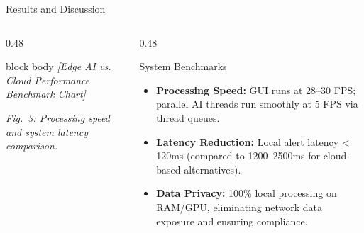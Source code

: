 \documentclass[aspectratio=169, 10pt]{beamer}
\begin{document}
\begin{frame}{Results and Discussion}
  \begin{columns}[T]
    \begin{column}{0.48\textwidth}
      \begin{beamercolorbox}[wd=\textwidth, rounded=true, sep=5pt,
            center]{block body}
        \vspace{1.8cm}
        \textit{\small [Edge AI vs. Cloud Performance Benchmark Chart]}
        \vspace{1.8cm}
      \end{beamercolorbox}
      \vspace{0.3em}
      {\footnotesize\textit{Fig.~3: Processing speed and system latency comparison.}}
    \end{column}
    \begin{column}{0.48\textwidth}
      \begin{block}{\textcolor{MLIOTwhite}{System Benchmarks}}
        \begin{itemize}
          \item \textbf{Processing Speed:} GUI runs at 28–30 FPS; parallel AI threads run smoothly at 5 FPS via thread queues.
          \item \textbf{Latency Reduction:} Local alert latency < 120ms (compared to 1200–2500ms for cloud-based alternatives).
          \item \textbf{Data Privacy:} 100\% local processing on RAM/GPU, eliminating network data exposure and ensuring compliance.
        \end{itemize}
      \end{block}
    \end{column}
  \end{columns}
\end{frame}
\end{document}
